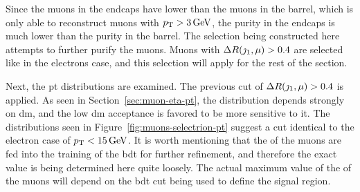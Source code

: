 Since the muons in the endcaps have lower \pt than the muons in the barrel, which is only able to reconstruct muons with $p_{\mathrm{T}}>3\,\text{Ge\hspace{-.08em}V}$, the purity in the endcaps is much lower than the purity in the barrel. The selection being constructed here attempts to further purify the muons. Muons with $\Delta R(\jmath_1,\mu)>0.4$ are selected like in the electrons case, and this selection will apply for the rest of the section.

Next, the \gls{pt} distributions are examined. The previous cut of $\Delta R(\jmath_1,\mu)>0.4$ is applied. As seen in Section~\ref{sec:muon-eta-pt}, the \pt distribution depends strongly on \gls{dm}, and the low \gls{dm} acceptance is favored to be more sensitive to it. The \pt distributions seen in Figure~\ref{fig:muons-selectrion-pt} suggest a cut identical to the electron case of $p_{\mathrm{T}}<15\,\text{Ge\hspace{-.08em}V}$. It is worth mentioning that the \pt of the muons are fed into the training of the \gls{bdt} for further refinement, and therefore the exact value is being determined here quite loosely. The actual maximum value of the \pt of the muons will depend on the \gls{bdt} cut being used to define the signal region.

